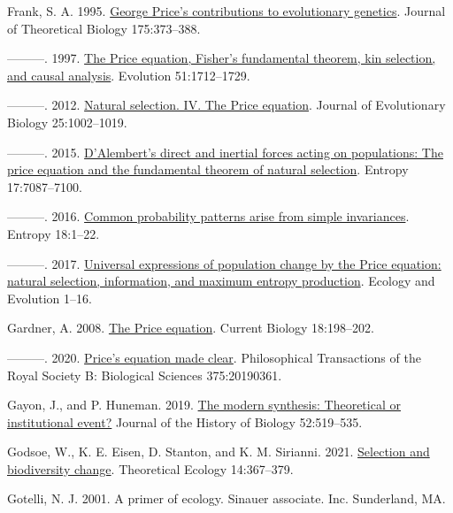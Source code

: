 \documentclass[
]{article}
\newlength{\cslhangindent}
\newenvironment{CSLReferences}[2] %
 {\begin{list}{}{%
  \setlength{\itemindent}{0pt}
  \setlength{\leftmargin}{0pt}
  \setlength{\parsep}{0pt}
  \ifodd #1
   \setlength{\leftmargin}{\cslhangindent}
   \setlength{\itemindent}{-1\cslhangindent}
  \fi
  \setlength{\itemsep}{#2\baselineskip}}}
 {\end{list}}
\begin{document}
\begin{CSLReferences}{0}{0}
Frank, S. A. 1995. \href{https://doi.org/10.1006/jtbi.1995.0148}{{George
Price's contributions to evolutionary genetics}}. Journal of Theoretical
Biology 175:373--388.

---------. 1997.
\href{https://doi.org/10.1111/j.1558-5646.1997.tb05096.x}{{The Price
equation, Fisher's fundamental theorem, kin selection, and causal
analysis}}. Evolution 51:1712--1729.

---------. 2012.
\href{https://doi.org/10.1111/j.1420-9101.2012.02498.x}{{Natural
selection. IV. The Price equation}}. Journal of Evolutionary Biology
25:1002--1019.

---------. 2015. \href{https://doi.org/10.3390/e17107087}{{D'Alembert's
direct and inertial forces acting on populations: The price equation and
the fundamental theorem of natural selection}}. Entropy 17:7087--7100.

---------. 2016. \href{https://doi.org/10.3390/e18050192}{{Common
probability patterns arise from simple invariances}}. Entropy 18:1--22.

---------. 2017. \href{https://doi.org/10.1002/ece3.2922}{{Universal
expressions of population change by the Price equation: natural
selection, information, and maximum entropy production}}. Ecology and
Evolution 1--16.

Gardner, A. 2008. \href{https://doi.org/10.1016/j.cub.2008.01.005}{{The
Price equation}}. Current Biology 18:198--202.

---------. 2020. \href{https://doi.org/10.1098/rstb.2019.0361}{{Price's
equation made clear}}. Philosophical Transactions of the Royal Society
B: Biological Sciences 375:20190361.

Gayon, J., and P. Huneman. 2019.
\href{https://doi.org/10.1007/s10739-019-09569-2}{The modern synthesis:
Theoretical or institutional event?} Journal of the History of Biology
52:519--535.

Godsoe, W., K. E. Eisen, D. Stanton, and K. M. Sirianni. 2021.
\href{https://doi.org/10.1007/s12080-020-00478-3}{Selection and
biodiversity change}. Theoretical Ecology 14:367--379.

Gotelli, N. J. 2001. A primer of ecology. Sinauer associate. Inc.
Sunderland, MA.


\end{CSLReferences}
\end{document}
